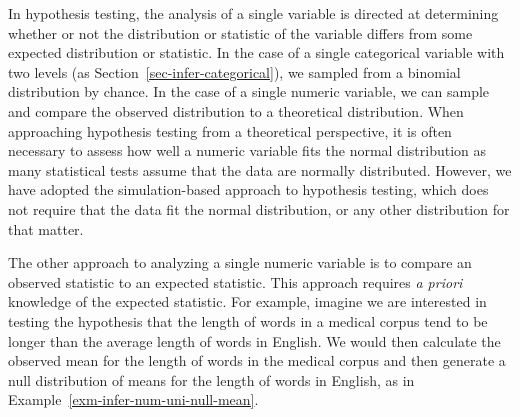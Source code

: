 \documentclass[
  letterpaper,
  krantz1]{latex/krantz-mod}
\theoremstyle{definition}
\theoremstyle{definition}
\theoremstyle{remark}
\begin{document}
In hypothesis testing, the analysis of a single variable is directed at
determining whether or not the distribution or statistic of the variable
differs from some expected distribution or statistic. In the case of a
single categorical variable with two levels (as
Section~\ref{sec-infer-categorical}), we sampled from a binomial
distribution by chance. In the case of a single numeric variable, we can
sample and compare the observed distribution to a theoretical
distribution. When approaching hypothesis testing from a theoretical
perspective, it is often necessary to assess how well a numeric variable
fits the normal distribution as many statistical tests assume that the
data are normally distributed. However, we have adopted the
simulation-based approach to hypothesis testing, which does not require
that the data fit the normal distribution, or any other distribution for
that matter.

The other approach to analyzing a single numeric variable is to compare
an observed statistic to an expected statistic. This approach requires
\emph{a priori} knowledge of the expected statistic. For example,
imagine we are interested in testing the hypothesis that the length of
words in a medical corpus tend to be longer than the average length of
words in English. We would then calculate the observed mean for the
length of words in the medical corpus and then generate a null
distribution of means for the length of words in English, as in
Example~\ref{exm-infer-num-uni-null-mean}.

\pagebreak
\end{document}
